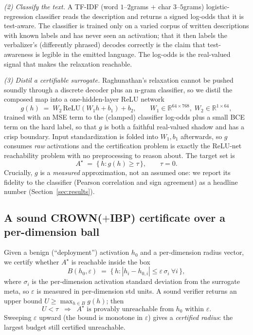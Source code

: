 \emph{(2) Classify the text.} A TF-IDF (word $1$--$2$grams $+$ char $3$--$5$grams)
logistic-regression classifier reads the description and returns a signed log-odds
that it is test-aware. The classifier is trained only on a varied corpus of
written descriptions with known labels and has never seen an activation; that it
then labels the verbalizer's (differently phrased) decodes correctly is the claim
that test-awareness is legible in the emitted language. The log-odds is the
real-valued signal that makes the relaxation reachable.

\emph{(3) Distil a certifiable surrogate.} Raghunathan's relaxation cannot be
pushed soundly through a discrete decoder plus an n-gram classifier, so we distil
the composed map into a one-hidden-layer ReLU network
\[
g(h) \;=\; W_2\,\mathrm{ReLU}(W_1 h + b_1) + b_2,
\qquad W_1 \in \mathbb{R}^{64\times 768},\; W_2 \in \mathbb{R}^{1\times 64},
\]
trained with an MSE term to the (clamped) classifier log-odds plus a small BCE term
on the hard label, so that $g$ is both a faithful real-valued shadow and has a crisp
boundary. Input standardization is folded into $W_1, b_1$ afterwards, so $g$
consumes \emph{raw} activations and the certification problem is exactly the
ReLU-net reachability problem with no preprocessing to reason about. The target set
is
\[
A^\star \;=\; \{\, h : g(h) \ge \tau \,\}, \qquad \tau = 0 .
\]
Crucially, $g$ is a \emph{measured} approximation, not an assumed one: we report
its fidelity to the classifier (Pearson correlation and sign agreement) as a
headline number (Section~\ref{sec:results}).

\subsection{A sound CROWN($+$IBP) certificate over a per-dimension ball}

Given a benign (``deployment'') activation $h_0$ and a per-dimension radius vector,
we certify whether $A^\star$ is reachable inside the box
\[
B(h_0,\varepsilon) \;=\; \{\, h : |h_i - h_{0,i}| \le \varepsilon\,\sigma_i \ \forall i \,\},
\]
where $\sigma_i$ is the per-dimension activation standard deviation from the
surrogate meta, so $\varepsilon$ is measured in per-dimension std units. A sound
verifier returns an upper bound $U \ge \max_{h \in B} g(h)$; then
\[
U < \tau \;\;\Longrightarrow\;\; A^\star \text{ is provably unreachable from } h_0
\text{ within } \varepsilon .
\]
Sweeping $\varepsilon$ upward (the bound is monotone in $\varepsilon$) gives a
\emph{certified radius}: the largest budget still certified unreachable.

